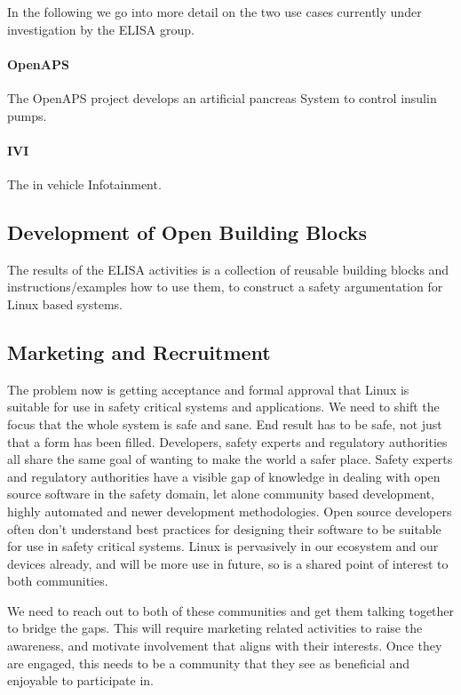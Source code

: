 \documentclass[12pt]{ElisaPaper}
\begin{document}
In the following we go into more detail on the two use cases currently under investigation by the ELISA group.
\paragraph{OpenAPS}

The OpenAPS project develops an artificial pancreas System to control insulin pumps.
%
\label{sssec:OpenAPS}

\paragraph{IVI}
\label{sssec:IVI}
The in vehicle Infotainment.

\subsection{Development of Open Building Blocks}
The results of the ELISA activities is a collection of reusable building blocks and instructions/examples how to use them, to construct a safety argumentation for Linux based systems.

\subsection{Marketing and Recruitment}
The problem now is getting acceptance and formal approval that Linux is suitable for use in safety critical systems and applications. We need to shift the focus that the whole system is safe and sane. End result has to be safe,  not just that a form has been filled.  Developers, safety experts and regulatory authorities all share the same goal of wanting to make the world a safer place.  Safety experts and regulatory authorities have a visible gap of knowledge in dealing with open source software in the safety domain,  let alone community based development,  highly automated and newer development methodologies.   Open source developers often don’t understand best practices for designing their software to be suitable for use in safety critical systems.  Linux is pervasively in our ecosystem and our devices already,  and will be more use in future, so is a shared point of interest to both communities.   


We need to reach out to both of these communities and get them talking together to bridge the gaps.   This will require marketing related activities to raise the awareness, and motivate involvement that aligns with their interests.   Once they are engaged, this needs to be a community that they see as beneficial and enjoyable to participate in. 
\end{document}
